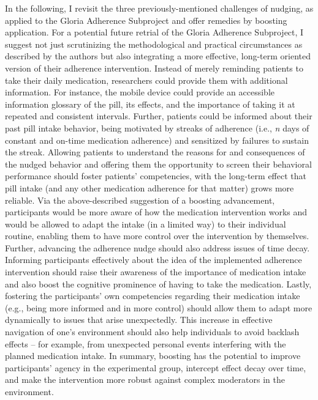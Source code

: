 \documentclass[reflection, authordate,issue]{jote-new-article}
\begin{document}
In the following, I revisit the three previously-mentioned challenges of nudging, as applied to the Gloria Adherence Subproject and offer remedies by boosting application. For a potential future retrial of the Gloria Adherence Subproject, I suggest not just scrutinizing the methodological and practical circumstances as described by the authors but also integrating a more effective, long-term oriented version of their adherence intervention. Instead of merely reminding patients to take their daily medication, researchers could provide them with additional information. For instance, the mobile device could provide an accessible information glossary of the pill, its effects, and the importance of taking it at repeated and consistent intervals. Further, patients could be informed about their past pill intake behavior, being motivated by streaks of adherence (i.e., \emph{n }days of constant and on-time medication adherence) and sensitized by failures to sustain the streak. Allowing patients to understand the reasons for and consequences of the nudged behavior and offering them the opportunity to screen their behavioral performance should foster patients’ competencies, with the long-term effect that pill intake (and any other medication adherence for that matter) grows more reliable. Via the above-described suggestion of a boosting advancement, participants would be more aware of how the medication intervention works and would be allowed to adapt the intake (in a limited way) to their individual routine, enabling them to have more control over the intervention by themselves. Further, advancing the adherence nudge should also address issues of time decay. Informing participants effectively about the idea of the implemented adherence intervention should raise their awareness of the importance of medication intake and also boost the cognitive prominence of having to take the medication. Lastly, fostering the participants’ own competencies regarding their medication intake (e.g., being more informed and in more control) should allow them to adapt more dynamically to issues that arise unexpectedly. This increase in effective navigation of one’s environment should also help individuals to avoid backlash effects – for example, from unexpected personal events interfering with the planned medication intake. In summary, boosting has the potential to improve participants’ agency in the experimental group, intercept effect decay over time, and make the intervention more robust against complex moderators in the environment.
\end{document}
